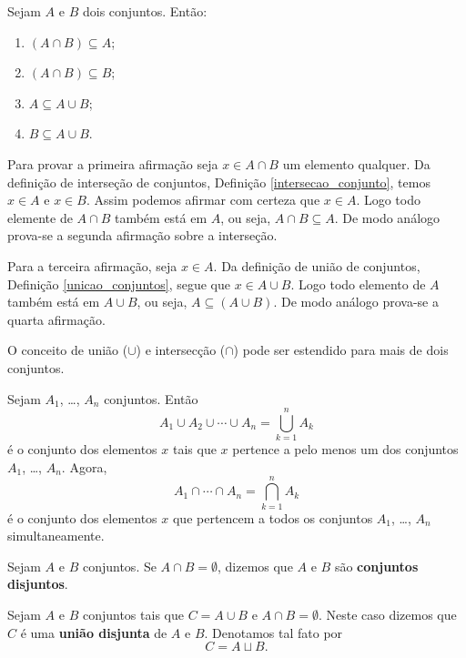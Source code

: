 \begin{proposicao} Sejam $A$ e $B$ dois conjuntos. Ent{\~a}o:
	\begin{enumerate}[label={\roman*})]
		\item $(A \cap B) \subseteq A$;
		\item $(A \cap B) \subseteq B$;
		\item $A \subseteq A \cup B$;
		\item $B \subseteq A \cup B$.
	\end{enumerate}
\end{proposicao}
\begin{prova}
	Para provar a primeira afirma\c{c}\~ao seja $x \in A \cap B$ um elemento qualquer. Da defini\c{c}\~ao de interse\c{c}\~ao de conjuntos, Defini\c{c}\~ao \ref{intersecao_conjunto}, temos $x \in A$ e $x \in B$. Assim podemos afirmar com certeza que $x \in A$. Logo todo elemente de $A \cap B$ tamb\'em est\'a em $A$, ou seja, $A \cap B \subseteq A$. De modo an\'alogo prova-se a segunda afirma\c{c}\~ao sobre a interse\c{c}\~ao.

	Para a terceira afirma\c{c}\~ao, seja $x \in A$. Da defini\c{c}\~ao de uni\~ao de conjuntos, Defini\c{c}\~ao \ref{unicao_conjuntos}, segue que $x \in A \cup B$. Logo todo elemento de $A$ tamb\'em est\'a em $A \cup B$, ou seja, $A \subseteq (A \cup B)$. De modo an\'alogo prova-se a quarta afirma\c{c}\~ao.
\end{prova}

O conceito de uni{\~a}o ($ \cup $) e intersec{\c c}{\~a}o ($ \cap $) pode ser estendido para mais de dois conjuntos.

\begin{definicao}
	Sejam $A_{1}$, \dots, $A_{n}$ conjuntos. Ent{\~a}o
	\[
		A_{1} \cup A_{2} \cup \cdots \cup A_{n}= \displaystyle\bigcup_{k=1}^n A_{k}
	\]
	{\'e} o conjunto dos elementos $x$ tais que $x$ pertence a pelo menos um dos conjuntos $A_{1}$, \dots, $A_{n}$. Agora,
	\[
		A_{1} \cap \cdots \cap A_{n} = \displaystyle\bigcap_{k=1}^{n}A_{k}
	\]
	{\'e} o conjunto dos elementos $x$ que pertencem a todos os conjuntos $A_{1}$, \dots, $A_{n}$ simultaneamente.
\end{definicao}

\begin{definicao}
	Sejam $A$ e $B$ conjuntos. Se $A \cap B = \emptyset$, dizemos que $A$ e $B$ s{\~a}o \textbf{conjuntos disjuntos}.
\end{definicao}


Sejam $A$ e $B$ conjuntos tais que $C = A \cup B$ e $A \cap B = \emptyset$. Neste caso dizemos que $C$ {\'e} uma \textbf{uni{\~a}o disjunta} de $A$ e $B$. Denotamos tal fato por
\[
	C = A \sqcup B.
\]

